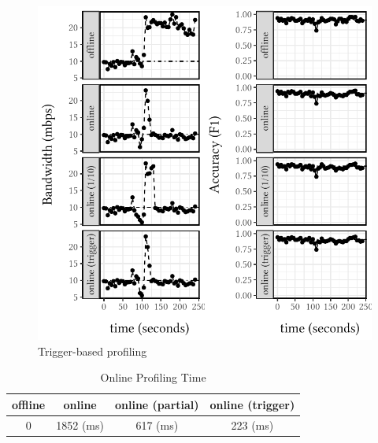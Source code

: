 \begin{figure}
  \centering
  \includegraphics[width=\columnwidth]{figures/online-profiling.pdf}
  \caption{Trigger-based profiling}
  \label{fig:online-tricks}
\end{figure}

\begin{table}[t]
  \centering
  \begin{tabular}{c|c|c|c}
    \hline
    offline & online & online (partial) & online (trigger) \\
    \hline
    0       & 1852 (ms)   & 617 (ms)              & 223 (ms) \\
    \hline
  \end{tabular}
  \caption{Online Profiling Time}
  \label{tab:online}
\end{table}

